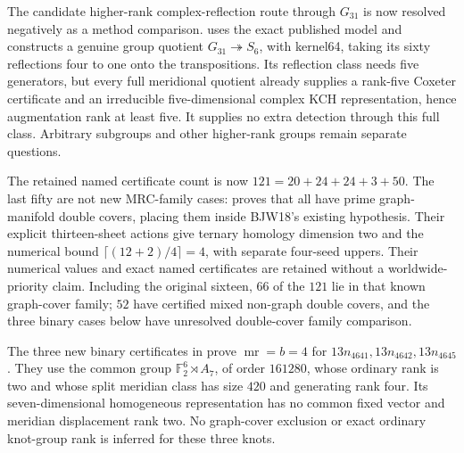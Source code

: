 \documentclass[11pt]{article}
\newcommand{\mr}{\operatorname{mr}}
\newcommand{\F}{\mathbb F}
\begin{document}
The candidate higher-rank complex-reflection route through $G_{31}$
is now resolved negatively as a method comparison.
 uses the exact published model
\cite[Section6.1, equation6.1]{km25} and constructs a genuine group
quotient $G_{31}\twoheadrightarrow S_6$, with kernel64, taking its
sixty reflections four to one onto the transpositions.
Its reflection class needs five generators, but every full meridional
quotient already supplies a rank-five Coxeter certificate and an
irreducible five-dimensional complex KCH representation, hence
augmentation rank at least five. It supplies no extra detection through
this full class. Arbitrary subgroups and other higher-rank groups
remain separate questions.


The retained named certificate count is now $121=20+24+24+3+50$.
The last fifty are not new MRC-family cases:
 proves that all have prime
graph-manifold double covers, placing them inside BJW18's existing
hypothesis. Their explicit thirteen-sheet actions give ternary
homology dimension two and the numerical bound
$\lceil(12+2)/4\rceil=4$, with separate four-seed uppers.
Their numerical values and exact named certificates are retained
without a worldwide-priority claim. Including the original sixteen,
$66$ of the $121$ lie in that known graph-cover family; $52$ have
certified mixed non-graph double covers, and the three binary cases
below have unresolved double-cover family comparison.

The three new binary certificates in
 prove $\mr=b=4$ for
$13n_{4641},13n_{4642},13n_{4645}$.
They use the common group $\F_2^6\rtimes A_7$, of order $161280$,
whose ordinary rank is two and whose split meridian class has size $420$
and generating rank four. Its seven-dimensional homogeneous
representation has no common fixed vector and meridian displacement
rank two. No graph-cover exclusion or exact ordinary knot-group rank
is inferred for these three knots.
\end{document}
